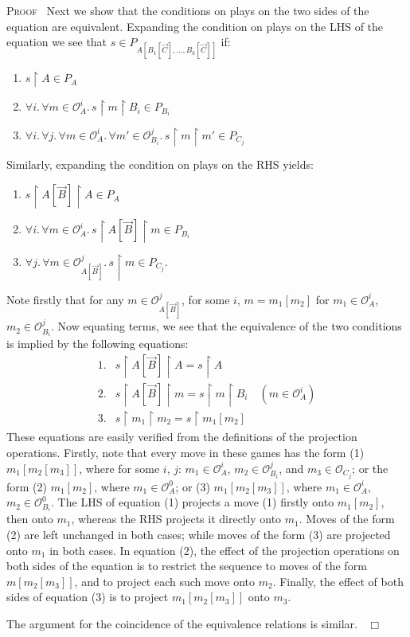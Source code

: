 \documentclass[a4paper,11pt]{article}
\newcommand{\restrict}{{\upharpoonright}}
\newcommand{\Occ}{\mathcal{O}}
\newenvironment{proof}{\textsc{Proof}\ }{$\;\; \Box$}
\begin{document}
\begin{proof}
Next we show that the conditions on plays on the two sides of the
equation are equivalent. Expanding the condition on plays on the LHS of the equation we see that $s \in P_{A[B_1 [\vec{C}], \ldots , B_k [\vec{C}]]}$ if:
\begin{enumerate}
\item $s \restrict A \in P_A$
\item $\forall i. \, \forall m \in \Occ_A^i . \, s \restrict m \restrict B_i \in P_{B_i}$
\item $\forall i. \, \forall j. \, \forall m \in \Occ_A^i . \,\forall m' \in \Occ_{B_i}^j . \, s \restrict m \restrict m' \in P_{C_j}$
\end{enumerate}
Similarly, expanding the condition on plays on the RHS yields:
\begin{enumerate}
\item $s \restrict A[\vec{B}] \restrict A \in P_A$
\item $\forall i. \, \forall m \in \Occ_A^i . \, s \restrict A[\vec{B}] \restrict m \in P_{B_i}$
\item $\forall j. \, \forall m \in \Occ_{A[\vec{B}]}^j . \, s \restrict m\in P_{C_j}$.
\end{enumerate}
Note firstly that for any $m \in \Occ_{A[\vec{B}]}^j$, for some $i$, $m = m_1[m_2]$ for $m_1 \in \Occ_A^i$, $m_2 \in \Occ_{B_i}^j$.
Now equating terms, we see that the equivalence of the two conditions is implied by the following equations:
\[ \begin{array}{ll}
1. &  s \restrict A[\vec{B}] \restrict A = s \restrict A \\
2. &  s \restrict A[\vec{B}] \restrict m = s \restrict m \restrict B_i \quad (m \in \Occ_A^i ) \\
3. & s \restrict m_1 \restrict m_2 = s \restrict m_1[m_2]
\end{array} \]
These equations are easily verified from the definitions of the
projection operations. Firstly, note that every move in these
games has the form (1) $m_1[m_2[m_3]]$, where for some $i$, $j$: $m_1 \in
\Occ_A^i$, $m_2 \in \Occ_{B_i}^j$, and $m_3 \in \Occ_{C_j}$; or the
form (2) $m_1[m_2]$, where $m_1 \in \Occ_A^0$; or (3) $m_1[m_2[m_3]]$, where $m_1 \in
\Occ_A^i$, $m_2 \in \Occ_{B_i}^0$. The LHS
of equation (1) projects  a move (1) firstly onto $m_1[m_2]$, then
onto $m_1$, whereas the RHS projects it directly onto $m_1$. Moves of
the form (2) are left unchanged in both cases; while moves of the
form (3) are projected onto $m_1$ in both cases.
In
equation (2), the effect of  the projection operations on both sides
of the equation is to
restrict the sequence to moves of the form $m[m_2[m_3]]$, and to
project each such move onto $m_2$. Finally, the effect of both sides
of equation (3) is to project $m_1[m_2[m_3]]$ onto $m_3$.

The argument for the coincidence of the equivalence relations is
similar.
\end{proof}
\end{document}
